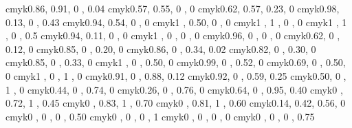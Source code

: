 \definecolor{blueviolet}    {cmyk}{0.86, 0.91, 0   , 0.04}
\definecolor{periwinkle}    {cmyk}{0.57, 0.55, 0   , 0   }
     {cmyk}{0.62, 0.57, 0.23, 0   }
  {cmyk}{0.98, 0.13, 0   , 0.43}
      {cmyk}{0.94, 0.54, 0   , 0   }
     {cmyk}{1   , 0.50, 0   , 0   }
\definecolor{blue}          {cmyk}{1   , 1   , 0   , 0   }
     {cmyk}{1   , 1   , 0   , 0.5 }
\definecolor{cerulean}      {cmyk}{0.94, 0.11, 0   , 0   }
\definecolor{cyan}          {cmyk}{1   , 0   , 0   , 0   }
\definecolor{processblue}   {cmyk}{0.96, 0   , 0   , 0   }
\definecolor{skyblue}       {cmyk}{0.62, 0   , 0.12, 0   }
\definecolor{turquoise}     {cmyk}{0.85, 0   , 0.20, 0   }
\definecolor{tealblue}      {cmyk}{0.86, 0   , 0.34, 0.02}
\definecolor{aquamarine}    {cmyk}{0.82, 0   , 0.30, 0   }
\definecolor{bluegreen}     {cmyk}{0.85, 0   , 0.33, 0   }
\definecolor{emerald}       {cmyk}{1   , 0   , 0.50, 0   }
\definecolor{junglegreen}   {cmyk}{0.99, 0   , 0.52, 0   }
\definecolor{seagreen}      {cmyk}{0.69, 0   , 0.50, 0   }
\definecolor{green}         {cmyk}{1   , 0   , 1   , 0   }
\definecolor{forestgreen}   {cmyk}{0.91, 0   , 0.88, 0.12}
\definecolor{pinegreen}     {cmyk}{0.92, 0   , 0.59, 0.25}
\definecolor{limegreen}     {cmyk}{0.50, 0   , 1   , 0   }
\definecolor{yellowgreen}   {cmyk}{0.44, 0   , 0.74, 0   }
\definecolor{springgreen}   {cmyk}{0.26, 0   , 0.76, 0   }
\definecolor{olivegreen}    {cmyk}{0.64, 0   , 0.95, 0.40}
\definecolor{rawsienna}     {cmyk}{0   , 0.72, 1   , 0.45}
\definecolor{sepia}         {cmyk}{0   , 0.83, 1   , 0.70}
\definecolor{brown}         {cmyk}{0   , 0.81, 1   , 0.60}
\definecolor{tan}           {cmyk}{0.14, 0.42, 0.56, 0   }
\definecolor{gray}          {cmyk}{0   , 0   , 0   , 0.50}
\definecolor{black}         {cmyk}{0   , 0   , 0   , 1   }
\definecolor{white}         {cmyk}{0   , 0   , 0   , 0   } 
\definecolor{darkgray}      {cmyk}{0   , 0   , 0   , 0.75}




